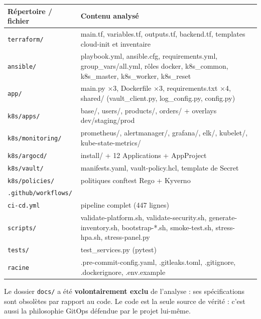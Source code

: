 \documentclass[12pt,a4paper,twoside,openright]{report}
\begin{document}
\begin{center}\label{tab:ch-methodologie-et-perimetre-de-l-analyse-sources-a}\end{center}
\begin{longtable}{@{}p{4.6cm}p{9.6cm}@{}}
\toprule
\textbf{Répertoire / fichier} & \textbf{Contenu analysé} \\
\midrule
\endhead
\texttt{terraform/} & main.tf, variables.tf, outputs.tf, backend.tf, templates cloud-init et inventaire \\
\texttt{ansible/} & playbook.yml, ansible.cfg, requirements.yml, group\_vars/all.yml, rôles docker, k8s\_common, k8s\_master, k8s\_worker, k8s\_reset \\
\texttt{app/} & main.py ×3, Dockerfile ×3, requirements.txt ×4, shared/ (vault\_client.py, log\_config.py, config.py) \\
\texttt{k8s/apps/} & base/, users/, products/, orders/ + overlays dev/staging/prod \\
\texttt{k8s/monitoring/} & prometheus/, alertmanager/, grafana/, elk/, kubelet/, kube-state-metrics/ \\
\texttt{k8s/argocd/} & install/ + 12 Applications + AppProject \\
\texttt{k8s/vault/} & manifests.yaml, vault-policy.hcl, template de Secret \\
\texttt{k8s/policies/} & politiques conftest Rego + Kyverno \\
\texttt{.github/workflows/}\\ \texttt{ci-cd.yml} & pipeline complet (447 lignes) \\
\texttt{scripts/} & validate-platform.sh, validate-security.sh, generate-inventory.sh, bootstrap-*.sh, smoke-test.sh, stress-hpa.sh, stress-panel.py \\
\texttt{tests/} & test\_services.py (pytest) \\
\texttt{racine} & .pre-commit-config.yaml, .gitleaks.toml, .gitignore, .dockerignore, .env.example \\
\bottomrule
\end{longtable}

\begin{whybox}
Le dossier \texttt{docs/} a été \textbf{volontairement exclu} de l'analyse : ses spécifications sont obsolètes par rapport au code. Le code est la seule source de vérité : c'est aussi la philosophie GitOps défendue par le projet lui-même.
\end{whybox}
\end{document}

